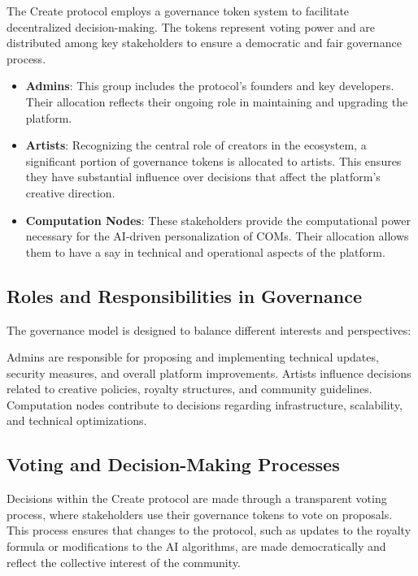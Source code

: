 \documentclass[12pt,a4paper]{article}
\begin{document}
The Create protocol employs a governance token system to facilitate decentralized decision-making. The tokens represent voting power and are distributed among key stakeholders to ensure a democratic and fair governance process.

\begin{itemize}
    \item \textbf{Admins}: This group includes the protocol's founders and key developers. Their allocation reflects their ongoing role in maintaining and upgrading the platform.
    \item \textbf{Artists}: Recognizing the central role of creators in the ecosystem, a significant portion of governance tokens is allocated to artists. This ensures they have substantial influence over decisions that affect the platform's creative direction.
    \item \textbf{Computation Nodes}: These stakeholders provide the computational power necessary for the AI-driven personalization of COMs. Their allocation allows them to have a say in technical and operational aspects of the platform.
\end{itemize}

\subsection{Roles and Responsibilities in Governance}

The governance model is designed to balance different interests and perspectives:

Admins are responsible for proposing and implementing technical updates, security measures, and overall platform improvements.
Artists influence decisions related to creative policies, royalty structures, and community guidelines.
Computation nodes contribute to decisions regarding infrastructure, scalability, and technical optimizations.

\subsection{Voting and Decision-Making Processes}

Decisions within the Create protocol are made through a transparent voting process, where stakeholders use their governance tokens to vote on proposals. This process ensures that changes to the protocol, such as updates to the royalty formula or modifications to the AI algorithms, are made democratically and reflect the collective interest of the community.
\end{document}
